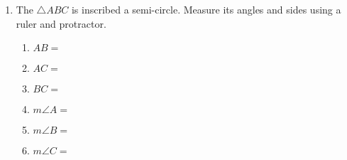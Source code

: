 \begin{enumerate}
\item The $\triangle ABC$ is inscribed a semi-circle. Measure its angles and sides using a ruler and protractor.
\begin{multicols}{2}
  \begin{enumerate}[itemsep=0.2cm]
    \item $AB=$
    \item $AC=$
    \item $BC=$
    \item $m\angle A=$
    \item $m\angle B=$
    \item $m\angle C=$
  \end{enumerate}
\end{multicols}
  \begin{center}
  \end{center}

\end{enumerate}
